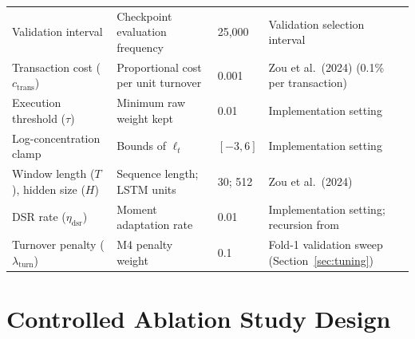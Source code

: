 \documentclass[11pt,a4paper]{article}
\numberwithin{equation}{section}
\numberwithin{table}{section}
\numberwithin{figure}{section}
\numberwithin{algorithm}{section}
\begin{document}
\begin{table}[!htbp]
\begin{tabular}{@{}p{3.6cm}p{4.0cm}p{1.6cm}p{6.0cm}@{}}
Validation interval & Checkpoint evaluation frequency & 25,000 & Validation selection interval\\
Transaction cost ($c_{\mathrm{trans}}$) & Proportional cost per unit turnover & 0.001 & Zou et al.\ (2024) \cite{zou2024} (0.1\% per transaction)\\
Execution threshold ($\tau$) & Minimum raw weight kept & 0.01 & Implementation setting\\
Log-concentration clamp & Bounds of $\ell_t$ & $[-3,6]$ & Implementation setting\\
Window length ($T$), hidden size ($H$) & Sequence length; LSTM units & 30; 512 & Zou et al.\ (2024) \cite{zou2024}\\
DSR rate ($\eta_{\mathrm{dsr}}$) & Moment adaptation rate & 0.01 & Implementation setting; recursion from \cite{millea2021}\\
Turnover penalty ($\lambda_{\mathrm{turn}}$) & M4 penalty weight & 0.1 & Fold-1 validation sweep (Section~\ref{sec:tuning})\\
\bottomrule
\end{tabular}
\end{table}

\section{Controlled Ablation Study Design}\label{ch:ablation}
\end{document}
